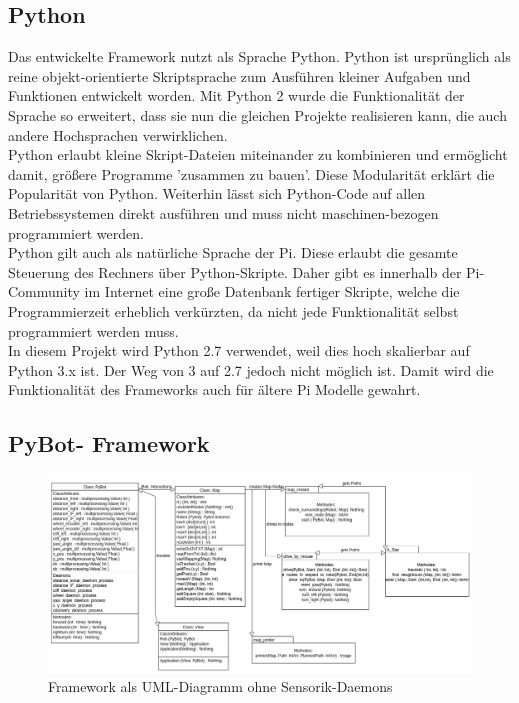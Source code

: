 \documentclass[twoside,11pt, a4paper]{report}
\begin{document}
	\subsection{Python}
	Das entwickelte Framework nutzt als Sprache Python. Python ist ursprünglich als reine objekt-orientierte Skriptsprache zum Ausführen kleiner Aufgaben und Funktionen entwickelt worden. Mit Python 2 wurde die Funktionalität der Sprache so erweitert, dass sie nun die gleichen Projekte realisieren kann, die auch andere Hochsprachen verwirklichen. \\
	Python erlaubt kleine Skript-Dateien miteinander zu kombinieren und ermöglicht damit, größere Programme 'zusammen zu bauen'. Diese Modularität erklärt die Popularität von Python. Weiterhin lässt sich Python-Code auf allen Betriebssystemen direkt ausführen und muss nicht maschinen-bezogen programmiert werden. \\
	Python gilt auch als natürliche Sprache der Pi. Diese erlaubt die gesamte Steuerung des Rechners über Python-Skripte. Daher gibt es innerhalb der Pi-Community im Internet eine große Datenbank fertiger Skripte, welche die Programmierzeit erheblich verkürzten, da nicht  jede Funktionalität selbst programmiert werden muss. \\
	In diesem Projekt wird Python 2.7 verwendet, weil dies hoch skalierbar auf Python 3.x ist. Der Weg von 3 auf 2.7 jedoch nicht möglich ist. Damit wird die Funktionalität des Frameworks auch für ältere Pi Modelle gewahrt.
	
	
	\subsection{PyBot- Framework}
	
	\begin{figure}[!htb]
		\centering
		\includegraphics[scale=0.50, angle=90]{images/software.png}
		\caption{Framework als UML-Diagramm ohne Sensorik-Daemons}
	\end{figure}
	
\end{document}
